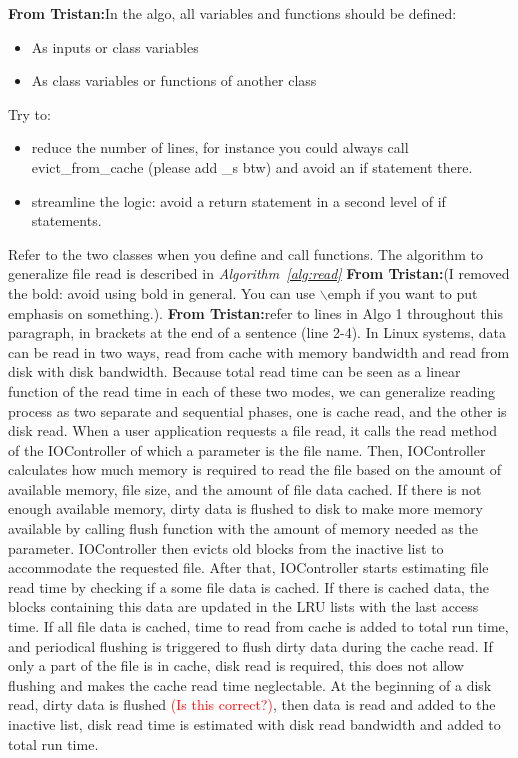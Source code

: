 \documentclass[conference]{IEEEtran}
\newcommand{\tristan}[1]{\color{orange}\textbf{From Tristan:}#1\color{black}}
\begin{document}
			\tristan{In the algo, all variables and functions should be defined:
			\begin{itemize}
				\item As inputs or class variables
				\item As class variables or functions of another class
			\end{itemize}
			Try to:
			\begin{itemize}
			\item reduce the number of lines, for instance you could always call evict\_from\_cache (please add \_s btw)
			and avoid an if statement there.
			\item streamline the logic: avoid a return statement in a second level of 
			if statements.
			\end{itemize}
			Refer to the two classes when you define and call functions. 
			}
			The algorithm to generalize file read is described in
			\textit{Algorithm~\ref{alg:read}} \tristan{(I removed the bold: avoid using bold in general.
			 You can use $\backslash$emph if you want to put emphasis on 
			something.)}. \tristan{refer to lines in Algo 1 throughout this paragraph, in brackets at the end of a sentence (line 2-4).} In Linux systems,
			data can be read in two ways, read from cache with memory
			bandwidth and read from disk with disk bandwidth. Because total
			read time can be seen as a linear function of the read time in
			each of these two modes, we can generalize reading process as
			two separate and sequential phases, one is cache read, and the
			other is disk read. When a user application requests a file
			read, it calls the read method of the IOController of which a
			parameter is the file name. Then, IOController calculates how
			much memory is required to read the file based on the amount of
			available memory, file size, and the amount of file data
			cached. If there is not enough available memory, dirty data is
			flushed to disk to make more memory available by calling flush
			function with the amount of memory needed as the parameter.
			IOController then evicts old  blocks from the inactive list to
			accommodate the requested file. After that, IOController starts
			estimating file read time by checking if a some file data is
			cached. If there is cached data, the blocks containing this
			data are  updated in the LRU lists with the last access time.
			If all file data is cached, time to read from cache is added to
			total run time, and periodical flushing is triggered to flush
			dirty data during the cache read. If only a part of the file is
			in cache, disk read is required, this does not allow flushing
			and makes the cache read time neglectable. At the beginning of
			a disk read, dirty data is flushed \textcolor{red}{(Is this
			correct?)}, then data is read and added to the inactive list,
			disk read time is estimated with disk read bandwidth and added
			to total run time. 			
\end{document}
